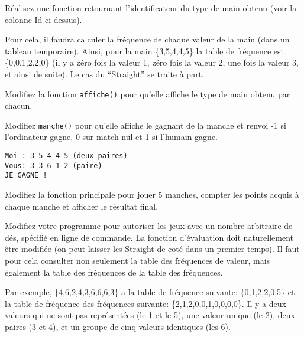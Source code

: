 \documentclass[10pt]{article}\usepackage[nu]{esial}
\begin{document}
\begin{Exercice}
  \Question Réalisez une fonction  retournant
  l'identificateur du type de main obtenu (voir la colonne Id ci-dessus).

  Pour cela, il faudra calculer la fréquence de chaque valeur de la main (dans
  un tableau temporaire). Ainsi, pour la main \{3,5,4,4,5\} la table de
  fréquence est \{0,0,1,2,2,0\} (il y a zéro fois la valeur 1, zéro fois la
  valeur 2, une fois la valeur 3, et ainsi de suite). Le cas du ``Straight'' se
  traite à part.

  \Question Modifiez la fonction \texttt{affiche()} pour qu'elle affiche le
  type de main obtenu par chacun.

  \noindent\begin{minipage}{.62\linewidth}

    \Question Modifiez \texttt{manche()} pour qu'elle affiche le gagnant de la
    manche et renvoi -1 si l'ordinateur gagne, 0 sur match nul et 1 si l'humain
    gagne. 

  \end{minipage}\hfill\begin{minipage}{.35\linewidth}
    \begin{Verbatim}
Moi : 3 5 4 4 5 (deux paires)
Vous: 3 3 6 1 2 (paire)
JE GAGNE !
    \end{Verbatim}
  \end{minipage}

  \Question Modifiez la fonction principale pour jouer 5 manches, compter
  les points acquis à chaque manche et afficher le résultat final.

  \Question Modifiez votre programme pour autoriser les jeux avec un nombre
  arbitraire de dés, spécifié en ligne de commande. La fonction d'évaluation
  doit naturellement être modifiée (on peut laisser les Straight de coté dans
  un premier temps).  Il faut pour cela consulter non seulement la table des
  fréquences de valeur, mais également la table des fréquences de la table des
  fréquences. 

  Par exemple, \{4,6,2,4,3,6,6,6,3\} a la table de fréquence suivante:
  \{0,1,2,2,0,5\} et la table de fréquence des fréquences suivante:
  \{2,1,2,0,0,1,0,0,0,0\}. Il y a deux valeurs qui ne sont pas représentées 
  (le 1 et le 5), une valeur unique (le 2), deux paires (3 et 4), et
  un groupe de cinq valeurs identiques (les 6). 



\end{Exercice}
\end{document}

